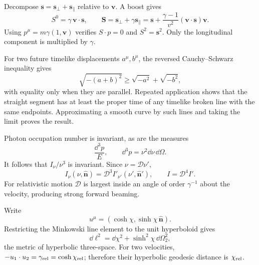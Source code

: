\begin{solution}
Decompose \(\bm s=\bm s_\perp+\bm s_\parallel\) relative to \(\bm v\).
A boost gives
\[
S^0=\gamma\,\bm v\cdot\bm s,\qquad
\bm S=\bm s_\perp+\gamma\bm s_\parallel
=\bm s+\frac{\gamma-1}{v^2}(\bm v\cdot\bm s)\bm v.
\]
Using \(p^\mu=m\gamma(1,\bm v)\) verifies \(S\cdot p=0\) and
\(S^2=\bm s^2\).  Only the longitudinal component is multiplied by
\(\gamma\).
\end{solution}

\begin{solution}
For two future timelike displacements \(a^\mu,b^\mu\), the reversed
Cauchy--Schwarz inequality gives
\[
\sqrt{-(a+b)^2}\geq\sqrt{-a^2}+\sqrt{-b^2},
\]
with equality only when they are parallel.  Repeated application shows that
the straight segment has at least the proper time of any timelike broken
line with the same endpoints.  Approximating a smooth curve by such lines and
taking the limit proves the result.
\end{solution}

\begin{solution}
Photon occupation number is invariant, as are the measures
\[
\frac{\dd^3p}{E},
\qquad
\dd^3p=\nu^2\dd\nu\,\dd\Omega.
\]
It follows that
\(I_\nu/\nu^3\) is invariant.  Since \(\nu=\mathcal D\nu'\),
\[
I_\nu(\nu,\hat{\bm n})=\mathcal D^3 I'_{\nu'}(\nu',\hat{\bm n}'),
\qquad I=\mathcal D^4 I'.
\]
For relativistic motion \(\mathcal D\) is largest inside an angle of order
\(\gamma^{-1}\) about the velocity, producing strong forward beaming.
\end{solution}

\begin{solution}
Write
\[
u^\mu=(\cosh\chi,\sinh\chi\,\hat{\bm n}).
\]
Restricting the Minkowski line element to the unit hyperboloid gives
\[
\dd\ell^2=\dd\chi^2+\sinh^2\chi\,\dd\Omega_2^2,
\]
the metric of hyperbolic three-space.  For two velocities,
\(-u_1\cdot u_2=\gamma_{\rm rel}=\cosh\chi_{\rm rel}\); therefore their
hyperbolic geodesic distance is \(\chi_{\rm rel}\).
\end{solution}
